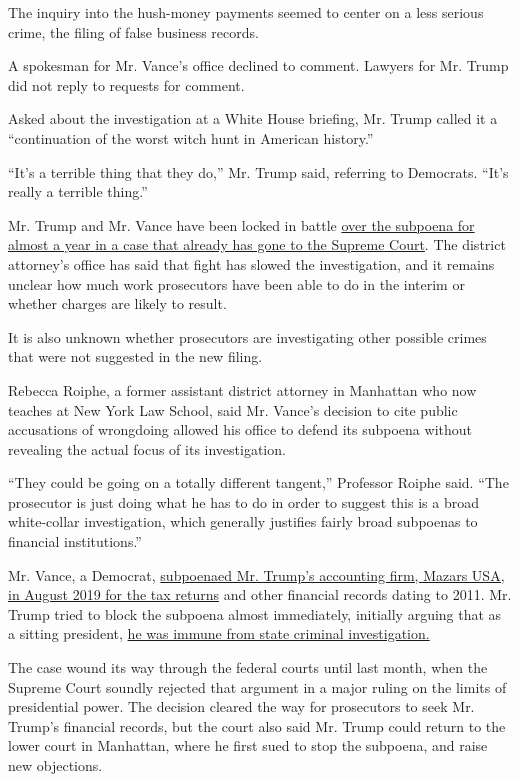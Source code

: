The inquiry into the hush-money payments seemed to center on a less
serious crime, the filing of false business records.

A spokesman for Mr. Vance's office declined to comment. Lawyers for Mr.
Trump did not reply to requests for comment.

Asked about the investigation at a White House briefing, Mr. Trump
called it a ``continuation of the worst witch hunt in American
history.''

``It's a terrible thing that they do,'' Mr. Trump said, referring to
Democrats. ``It's really a terrible thing.''

Mr. Trump and Mr. Vance have been locked in battle
\href{https://www.nytimes3xbfgragh.onion/interactive/2018/10/02/us/politics/donald-trump-tax-schemes-fred-trump.html}{over
the subpoena for almost a year in a case that already has gone to the
Supreme Court}. The district attorney's office has said that fight has
slowed the investigation, and it remains unclear how much work
prosecutors have been able to do in the interim or whether charges are
likely to result.

It is also unknown whether prosecutors are investigating other possible
crimes that were not suggested in the new filing.

Rebecca Roiphe, a former assistant district attorney in Manhattan who
now teaches at New York Law School, said Mr. Vance's decision to cite
public accusations of wrongdoing allowed his office to defend its
subpoena without revealing the actual focus of its investigation.

``They could be going on a totally different tangent,'' Professor Roiphe
said. ``The prosecutor is just doing what he has to do in order to
suggest this is a broad white-collar investigation, which generally
justifies fairly broad subpoenas to financial institutions.''

Mr. Vance, a Democrat,
\href{https://www.nytimes3xbfgragh.onion/2019/09/16/nyregion/trump-tax-returns-cy-vance.html}{subpoenaed
Mr. Trump's accounting firm, Mazars USA, in August 2019 for the tax
returns} and other financial records dating to 2011. Mr. Trump tried to
block the subpoena almost immediately, initially arguing that as a
sitting president,
\href{https://www.nytimes3xbfgragh.onion/2019/09/19/nyregion/trump-tax-returns-lawsuit.html}{he
was immune from state criminal investigation.}

The case wound its way through the federal courts until last month, when
the Supreme Court soundly rejected that argument in a major ruling on
the limits of presidential power. The decision cleared the way for
prosecutors to seek Mr. Trump's financial records, but the court also
said Mr. Trump could return to the lower court in Manhattan, where he
first sued to stop the subpoena, and raise new objections.

